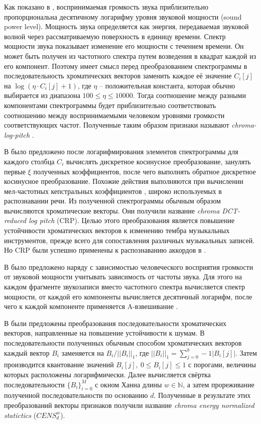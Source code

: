 Как показано в \cite{Fletcher1933}, воспринимаемая громкость звука
приблизительно пропорциональна десятичному логарифму уровня звуковой мощности
(sound power level). Мощность звука определяется как энергия, передаваемая
звуковой волной через рассматриваемую поверхность в единицу времени. Спектр
мощности звука показывает изменение его мощности с течением времени. Он может
быть получен из частотного спектра путем возведения в квадрат каждой из его
компонент. Поэтому имеет смысл перед преобразованием спектрограммы в
последовательность хроматических векторов заменить каждое её значение $C_i[j]$
на $\log (\eta \cdot C_i[j] + 1)$, где $\eta$ -- положительная константа,
которая обычно выбирается из диапазона $100 \leq \eta \leq 10000$. Тогда
соотношение между разными компонентами спектрограммы будет приблизительно
соответствовать соотношению между воспринимаемыми человеком уровнями громкости
соответствующих частот. Полученные таким образом признаки называют
\emph{chroma-log-pitch} \cite{Jiang2011}.

В \cite{Mueller2009} было предложено после логарифмирования элементов
спектрограммы для каждого столбца $C_i$ вычислять дискретное косинусное
преобразование, занулять первые $\xi$ полученных коэффициентов, после чего
выполнять обратное дискретное косинусное преобразование. Похожие действия
выполняются при вычислении мел-частотных кепстральных коэффициентов
\cite{Logan2000}, широко используемых в распознавании речи. Из полученной
спектрограммы обычным образом вычисляются хроматические векторы. Они получили
название \emph{chroma DCT-reduced log pitch} (CRP). Целью этого преобразования
является повышение устойчивости хроматических векторов к изменению тембра
музыкальных инструментов, прежде всего для сопоставления различных музыкальных
записей. Но CRP были успешно применены к распознаванию аккордов в
\cite{Cho2011}.

В \cite{Ni2011} было предложено наряду с зависимостью человеческого восприятия
громкости от звуковой мощности учитывать зависимость от частоты звука. Для этого
на каждом фрагменте звукозаписи вместо частотного спектра вычисляется спектр
мощности, от каждой его компоненты вычисляется десятичный логарифм, после чего к
каждой компоненте применяется A-взвешивание \cite{TalbotSmith1999}.

В \cite{Mueller2007} были предложены преобразования последовательности
хроматических векторов, направленные на повышение устойчивости к шумам.
В последовательности полученных обычным способом хроматических векторов каждый
вектор $B_i$ заменяется на $B_i/||B_i||_1$, где $||B_i||_1 = \sum_{j=0}^b-1
|B_i[j]|$. Затем производится квантование значений $B_i[j],~0 \leq B_i[j] \leq
1$ с порогами, величины которых расположены логарифмически. Далее вычисляется
свёртка последовательности $\{B_i\}_{i=0}^M$ с окном Ханна длины $w \in
\mathbb{N}$, а затем прореживание полученной последовательности по основанию
$d$. Полученные в результате этих преобразований векторы признаков получили
название \emph{chroma energy normalized statictics} ($CENS_d^w$).

